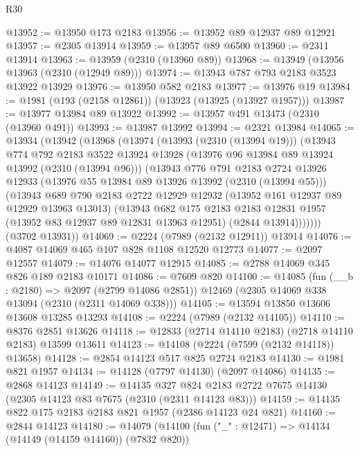 \begin{lexlean}{R30}
\begin{coremodule}
@13952 := @13950 @173 @2183
@13956 := @13952 @89 @12937 @89 @12921
@13957 := @2305 @13914
@13959 := @13957 @89 @6500
@13960 := @2311 @13914
@13963 := @13959 (@2310 (@13960 @89))
@13968 := @13949 (@13956 @13963 (@2310 (@12949 @89)))
@13974 := @13943 @787 @793 @2183 @3523 @13922 @13929
@13976 := @13950 @582 @2183
@13977 := @13976 @19
@13984 := @1981 (@193 (@2158 @12861)) (@13923 (@13925 (@13927 @1957)))
@13987 := @13977 @13984 @89 @13922
@13992 := @13957 @491 @13473 (@2310 (@13960 @491))
@13993 := @13987 @13992
@13994 := @2321 @13984
@14065 := @13934
    (@13942
      (@13968
        (@13974
          (@13993 (@2310 (@13994 @19)))
          (@13943
            @774
            @792
            @2183
            @3522
            @13924
            @13928
            (@13976 @96 @13984 @89 @13924 @13992 (@2310 (@13994 @96)))
            (@13943
              @776
              @791
              @2183
              @2724
              @13926
              @12933
              (@13976 @55 @13984 @89 @13926 @13992 (@2310 (@13994 @55)))
              (@13943
                @689
                @790
                @2183
                @2722
                @12929
                @12932
                (@13952 @161 @12937 @89 @12929 @13963 @13013)
                (@13943
                  @682
                  @175
                  @2183
                  @2183
                  @12831
                  @1957
                  (@13952 @83 @12937 @89 @12831 @13963 @12951)
                  (@2844 @13914)))))))
      (@3702 @13931))
@14069 := @2224 (@7989 (@2132 @12911)) @13914
@14076 := @4087 @14069 @465 @107 @828 @1108 @12520 @12773
@14077 := @2097 @12557
@14079 := @14076 @14077 @12915
@14085 := @2788 @14069 @345 @826 @189 @2183 @10171
@14086 := @7609 @820
@14100 := @14085
    (fun (__b : @2180) => @2097 (@2799 @14086 @2851))
    @12469
    (@2305 @14069 @338 @13094 (@2310 (@2311 @14069 @338)))
@14105 := @13594 @13850 @13606 @13608 @13285 @13293
@14108 := @2224 (@7989 (@2132 @14105))
@14110 := @8376 @2851 @13626
@14118 := @12833 (@2714 @14110 @2183) (@2718 @14110 @2183) @13599 @13611
@14123 := @14108 (@2224 (@7599 (@2132 @14118)) @13658)
@14128 := @2854 @14123 @517 @825 @2724 @2183
@14130 := @1981 @821 @1957
@14134 := @14128 (@7797 @14130) (@2097 @14086)
@14135 := @2868 @14123
@14149 := @14135
    @327
    @824
    @2183
    @2722
    @7675
    @14130
    (@2305 @14123 @83 @7675 (@2310 (@2311 @14123 @83)))
@14159 := @14135 @822 @175 @2183 @2183 @821 @1957 (@2386 @14123 @24 @821)
@14160 := @2844 @14123
@14180 := @14079
    (@14100
      (fun ("_" : @12471) => @14134 (@14149 (@14159 @14160)) (@7832 @820))

\end{coremodule}
\end{lexlean}
